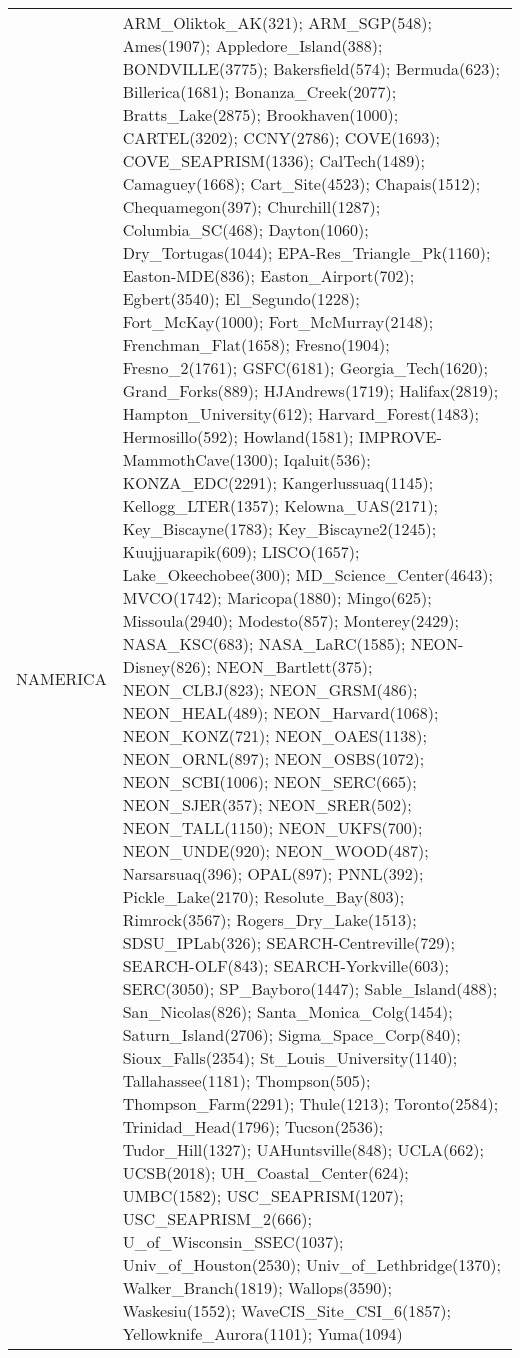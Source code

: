 \documentclass[journal abbreviation, manuscript]{copernicus}
\begin{document}
\begin{table}
\begin{tabularx}{\textwidth}{lX}
  NAMERICA &  ARM\_Oliktok\_AK(321); ARM\_SGP(548); Ames(1907); Appledore\_Island(388); BONDVILLE(3775); Bakersfield(574); Bermuda(623); Billerica(1681); Bonanza\_Creek(2077); Bratts\_Lake(2875); Brookhaven(1000); CARTEL(3202); CCNY(2786); COVE(1693); COVE\_SEAPRISM(1336); CalTech(1489); Camaguey(1668); Cart\_Site(4523); Chapais(1512); Chequamegon(397); Churchill(1287); Columbia\_SC(468); Dayton(1060); Dry\_Tortugas(1044); EPA-Res\_Triangle\_Pk(1160); Easton-MDE(836); Easton\_Airport(702); Egbert(3540); El\_Segundo(1228); Fort\_McKay(1000); Fort\_McMurray(2148); Frenchman\_Flat(1658); Fresno(1904); Fresno\_2(1761); GSFC(6181); Georgia\_Tech(1620); Grand\_Forks(889); HJAndrews(1719); Halifax(2819); Hampton\_University(612); Harvard\_Forest(1483); Hermosillo(592); Howland(1581); IMPROVE-MammothCave(1300); Iqaluit(536); KONZA\_EDC(2291); Kangerlussuaq(1145); Kellogg\_LTER(1357); Kelowna\_UAS(2171); Key\_Biscayne(1783); Key\_Biscayne2(1245); Kuujjuarapik(609); LISCO(1657); Lake\_Okeechobee(300); MD\_Science\_Center(4643); MVCO(1742); Maricopa(1880); Mingo(625); Missoula(2940); Modesto(857); Monterey(2429); NASA\_KSC(683); NASA\_LaRC(1585); NEON-Disney(826); NEON\_Bartlett(375); NEON\_CLBJ(823); NEON\_GRSM(486); NEON\_HEAL(489); NEON\_Harvard(1068); NEON\_KONZ(721); NEON\_OAES(1138); NEON\_ORNL(897); NEON\_OSBS(1072); NEON\_SCBI(1006); NEON\_SERC(665); NEON\_SJER(357); NEON\_SRER(502); NEON\_TALL(1150); NEON\_UKFS(700); NEON\_UNDE(920); NEON\_WOOD(487); Narsarsuaq(396); OPAL(897); PNNL(392); Pickle\_Lake(2170); Resolute\_Bay(803); Rimrock(3567); Rogers\_Dry\_Lake(1513); SDSU\_IPLab(326); SEARCH-Centreville(729); SEARCH-OLF(843); SEARCH-Yorkville(603); SERC(3050); SP\_Bayboro(1447); Sable\_Island(488); San\_Nicolas(826); Santa\_Monica\_Colg(1454); Saturn\_Island(2706); Sigma\_Space\_Corp(840); Sioux\_Falls(2354); St\_Louis\_University(1140); Tallahassee(1181); Thompson(505); Thompson\_Farm(2291); Thule(1213); Toronto(2584); Trinidad\_Head(1796); Tucson(2536); Tudor\_Hill(1327); UAHuntsville(848); UCLA(662); UCSB(2018); UH\_Coastal\_Center(624); UMBC(1582); USC\_SEAPRISM(1207); USC\_SEAPRISM\_2(666); U\_of\_Wisconsin\_SSEC(1037); Univ\_of\_Houston(2530); Univ\_of\_Lethbridge(1370); Walker\_Branch(1819); Wallops(3590); Waskesiu(1552); WaveCIS\_Site\_CSI\_6(1857); Yellowknife\_Aurora(1101); Yuma(1094) \\

\end{tabularx}
\end{table}
\end{document}
